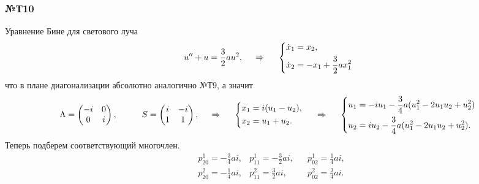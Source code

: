 \subsubsection*{№Т10}

 Уравнение Бине для светового луча 
\begin{equation*}
    u'' + u = \frac{3}{2} a u^2,
    \hspace{0.5cm} \Rightarrow \hspace{0.5cm}
    \left\{\begin{aligned}
        \dot{x}_1 &= x_2, \\
        \dot{x}_2 &= - x_1 + \frac{3}{2} a x_1^2
    \end{aligned}\right.
\end{equation*}
что в плане диагонализации абсолютно аналогично №Т9, а значит
\begin{equation*}
    \Lambda = \begin{pmatrix}
        -i & 0 \\
        0 & i \\
    \end{pmatrix},
    \hspace{1 cm}
    S = \begin{pmatrix}
        i & -i \\
        1 & 1 \\
    \end{pmatrix},
    \hspace{0.5cm} \Rightarrow \hspace{0.5cm}
    \left\{\begin{aligned}
        x_1 &= i (u_1 - u_2), \\
        x_2 &= u_1 + u_2.
    \end{aligned}\right.
    \hspace{0.5cm} \Rightarrow \hspace{0.5cm}
    \left\{\begin{aligned}
        u_1 &= - i u_1 - \frac{3}{4} a (u_1^2 - 2 u_1 u_2 + u_2^2) \\
        u_2 &= i u_2 - \frac{3}{4} a (u_1^2 - 2 u_1 u_2 + u_2^2).
    \end{aligned}\right.
\end{equation*}
Теперь подберем соответствующий многочлен.
\begin{align*}
    &p_{20}^1 = - \frac{3}{4} ai,
    &p_{11}^1 = - \frac{3}{2} ai,
    &&p_{02}^1 = \frac{1}{4}ai, \\
    &p_{20}^2 = -\frac{1}{4} ai,
    &p_{11}^2 = \frac{3}{2} ai,
    &&p_{02}^2 = \frac{3}{4} ai.
\end{align*}
